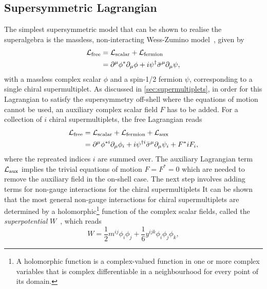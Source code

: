 \subsection{Supersymmetric Lagrangian}\label{sec:susy_lagrangian}

The simplest supersymmetric model that can be shown to realise the superalgebra is the massless, non-interacting Wess-Zumino model~\cite{WESS197439,Martin:1997ns}, given by 
\begin{equation}
\begin{split}
	\mathcal{L}_\mathrm{free} & = \mathcal{L}_\mathrm{scalar} + \mathcal{L}_\mathrm{fermion} \\
	& = \partial^\mu\phi^*\partial_\mu\phi + i\psi^\dagger\bar{\sigma}^\mu\partial_\mu\psi,
\end{split}
\end{equation}
with a massless complex scalar $\phi$ and a spin-1/2 fermion $\psi$, corresponding to a single chiral supermultiplet. As discussed in \cref{sec:supermultiplets}, in order for this Lagrangian to satisfy the supersymmetry off-shell where the equations of motion cannot be used, an auxiliary complex scalar field $F$ has to be added. For a collection of $i$ chiral supermultiplets, the free Lagrangian reads
\begin{equation}
\begin{split}
	\mathcal{L}_\mathrm{free} & = \mathcal{L}_\mathrm{scalar} + \mathcal{L}_\mathrm{fermion} + \mathcal{L}_\mathrm{aux} \\
	 & = \partial^\mu\phi^{*i}\partial_\mu\phi_i + i\psi^{\dagger i}\bar{\sigma}^\mu\partial_\mu\psi_i + F^*iF_i,
\end{split}
\end{equation} 
where the repreated indices $i$ are summed over. The auxiliary Lagrangian term $\mathcal{L}_\mathrm{aux}$ implies the trivial equations of motion $F = F^* = 0$ which are needed to remove the auxiliary field in the on-shell case. The next step involves adding terms for non-gauge interactions for the chiral supermultiplets  It can be shown that the most general non-gauge interactions for chiral supermultiplets are determined by a holomorphic\footnote{A holomorphic function is a complex-valued function in one or more complex variables that is complex differentiable in a neighbourhood for every point of its domain.} function of the complex scalar fields, called the \textit{superpotential} $W$~\cite{Martin:1997ns, Bustamante:2009us}, which reads
\begin{equation}
	W = \frac{1}{2}m^{ij}\phi_i \phi_j + \frac{1}{6}y^{ijk}\phi_i \phi_j \phi_k,
\end{equation}
